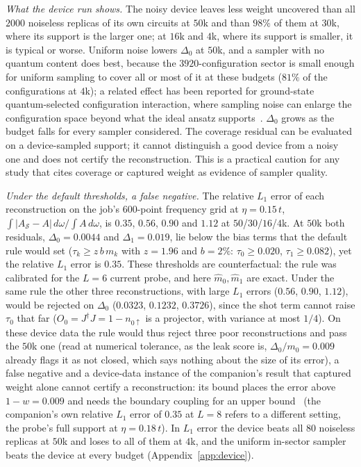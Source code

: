 \documentclass[submission, PhysCore]{SciPost}
\begin{document}
\emph{What the device run shows.} The noisy device leaves less weight uncovered than all $2000$ noiseless replicas of its own circuits at $50$k and than $98\%$ of them at $30$k, where its support is the larger one; at $16$k and $4$k, where its support is smaller, it is typical or worse. Uniform noise lowers $\Delta_0$ at $50$k, and a sampler with no quantum content does best, because the $3920$-configuration sector is small enough for uniform sampling to cover all or most of it at these budgets ($81\%$ of the configurations at $4$k); a related effect has been reported for ground-state quantum-selected configuration interaction, where sampling noise can enlarge the configuration space beyond what the ideal ansatz supports~\cite{VaqueroSabater2026}. $\Delta_0$ grows as the budget falls for every sampler considered. The coverage residual can be evaluated on a device-sampled support; it cannot distinguish a good device from a noisy one and does not certify the reconstruction. This is a practical caution for any study that cites coverage or captured weight as evidence of sampler quality.

\emph{Under the default thresholds, a false negative.} The relative $L_1$ error of each reconstruction on the job's $600$-point frequency grid at $\eta=0.15\,t$, ${\int|A_\mathcal S-A|\,d\omega/\!\int A\,d\omega}$, is $0.35$, $0.56$, $0.90$ and $1.12$ at $50$/$30$/$16$/$4$k. At $50$k both residuals, $\Delta_0=0.0044$ and $\Delta_1=0.019$, lie below the bias terms that the default rule would set ($\tau_k\ge z\,b\,m_k$ with $z=1.96$ and $b=2\%$: $\tau_0\ge0.020$, $\tau_1\ge0.082$), yet the relative $L_1$ error is $0.35$. These thresholds are counterfactual: the rule was calibrated for the $L=6$ current probe, and here $\widehat m_0,\widehat m_1$ are exact. Under the same rule the other three reconstructions, with large $L_1$ errors ($0.56$, $0.90$, $1.12$), would be rejected on $\Delta_0$ ($0.0323$, $0.1232$, $0.3726$), since the shot term cannot raise $\tau_0$ that far ($O_0=J^\dagger J=1-n_{0\uparrow}$ is a projector, with variance at most $1/4$). On these device data the rule would thus reject three poor reconstructions and pass the $50$k one (read at numerical tolerance, as the leak score is, $\Delta_0/m_0=0.009$ already flags it as not closed, which says nothing about the size of its error), a false negative and a device-data instance of the companion's result that captured weight alone cannot certify a reconstruction: its bound places the error above $1-w=0.009$ and needs the boundary coupling for an upper bound~\cite{SQDspec2608} (the companion's own relative $L_1$ error of $0.35$ at $L=8$ refers to a different setting, the probe's full support at $\eta=0.18\,t$). In $L_1$ error the device beats all $80$ noiseless replicas at $50$k and loses to all of them at $4$k, and the uniform in-sector sampler beats the device at every budget (Appendix~\ref{app:device}).
\end{document}
